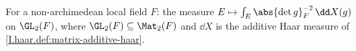 For a non-archimedean local field $F$: the measure $E\mapsto\int_E\abs{\det g}_F^{-2}\,\dd X(g)$ on $\GL_2(F)$, where $\GL_2(F)\subseteq\Mat_2(F)$ and $\dd X$ is the additive Haar measure of \cref{I.haar.def:matrix-additive-haar}.
